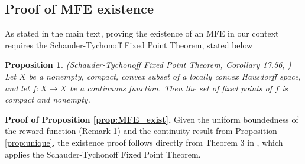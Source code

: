 \documentclass{article}
\theoremstyle{definition}
\theoremstyle{plain}
\newtheorem{proposition}{Proposition}
\begin{document}
\subsection{Proof of MFE existence}\label{subsec:Proof_MFEExist}
As stated in the main text, proving the existence of an MFE in our context requires the Schauder-Tychonoff Fixed Point Theorem, stated below

\begin{proposition}
	(Schauder-Tychonoff Fixed Point Theorem, Corollary 17.56, \cite{guide2006infinite}) Let $X$ be a nonempty, compact, convex subset of a locally convex Hausdorff space, and let $f: X \rightarrow X$ be a continuous function. Then the set of fixed points of $f$ is compact and nonempty.
\end{proposition}

\noindent \textbf{Proof of Proposition \ref{prop:MFE_exist}.} Given the uniform boundedness of the reward function (Remark 1) and the continuity result from Proposition \ref{prop:unique}, the existence proof follows directly from Theorem 3 in \cite{light2022mean}, which applies the Schauder-Tychonoff Fixed Point Theorem. %





\end{document}
